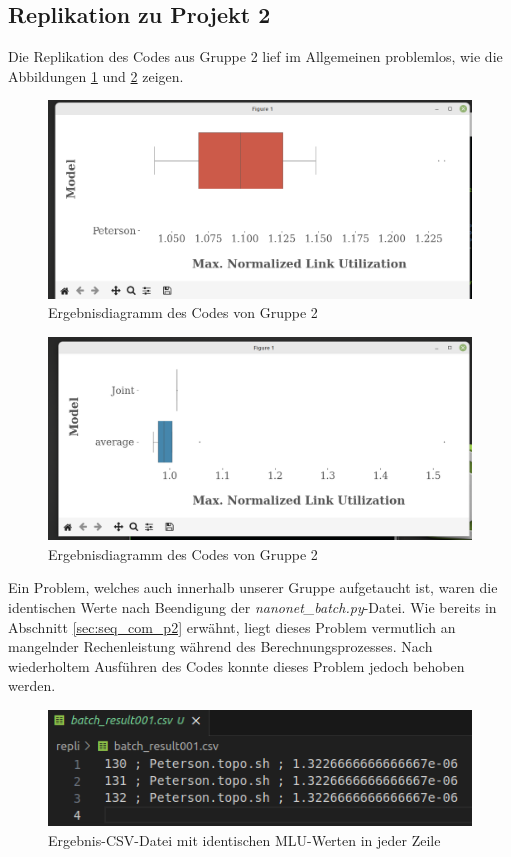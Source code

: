 \documentclass[sigconf, nonacm, review]{acmart}
\begin{document}
\subsection{Replikation zu Projekt 2}
Die Replikation des Codes aus Gruppe 2 lief im Allgemeinen problemlos, wie die Abbildungen \ref{fig:repl_p2_daniel2} und \ref{fig:repl_p2_zixiang_10} zeigen.
\begin{figure}
\centering
\includegraphics[width=\linewidth]{figures/repl_p2_daniel2.png}
\caption{Ergebnisdiagramm des Codes von Gruppe 2}
\label{fig:repl_p2_daniel2}
\end{figure}
\begin{figure}
\centering
\includegraphics[width=\linewidth]{figures/repl_p2_zixiang_10.png}
\caption{Ergebnisdiagramm des Codes von Gruppe 2}
\label{fig:repl_p2_zixiang_10}
\end{figure}
Ein Problem, welches auch innerhalb unserer Gruppe aufgetaucht ist,
waren die identischen Werte nach Beendigung der \emph{nanonet\_batch.py}-Datei.
Wie bereits in Abschnitt \ref{sec:seq_com_p2} erw\"ahnt, liegt dieses Problem vermutlich an mangelnder Rechenleistung w\"ahrend des Berechnungsprozesses.
Nach wiederholtem Ausf\"uhren des Codes konnte dieses Problem jedoch behoben werden.
\begin{figure}
\centering
\includegraphics[width=\linewidth]{figures/repl_p2_daniel1.png}
\caption{Ergebnis-CSV-Datei mit identischen MLU-Werten in jeder Zeile}
\label{fig:repl_p2_daniel1}
\end{figure}
\end{document}
